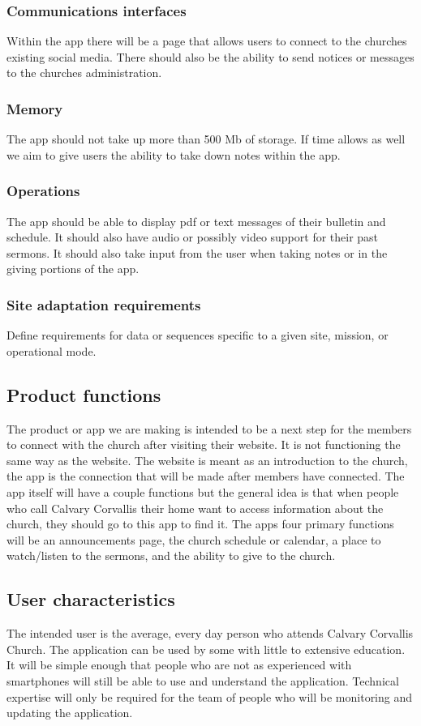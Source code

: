 \documentclass[letterpaper,10pt,draftclsnofoot,onecolumn,compsoc,titlepage]{IEEEtran}
\begin{document}
	\subsubsection{Communications interfaces}
	Within the app there will be a page that allows users to connect to the churches existing social media.
	There should also be the ability to send notices or messages to the churches administration.

	\subsubsection{Memory}
	The app should not take up more than 500 Mb of storage.
	If time allows as well we aim to give users the ability to take down notes within the app.

	\subsubsection{Operations}
	The app should be able to display pdf or text messages of their bulletin and schedule.
	It should also have audio or possibly video support for their past sermons.
	It should also take input from the user when taking notes or in the giving portions of the app.

	\subsubsection{Site adaptation requirements}
	Define requirements for data or sequences specific to a given site, mission, or operational mode.

	\subsection{Product functions}
	The product or app we are making is intended to be a next step for the members to connect with the church after visiting their website.
	It is not functioning the same way as the website.
	The website is meant as an introduction to the church, the app is the connection that will be made after members have connected.
	The app itself will have a couple functions but the general idea is that when people who call Calvary Corvallis their home want to access information about the church, they should go to this app to find it.
	The apps four primary functions will be an announcements page, the church schedule or calendar, a place to watch/listen to the sermons, and the ability to give to the church.

	\subsection{User characteristics}
	The intended user is the average, every day person who attends Calvary Corvallis Church.
	The application can be used by some with little to extensive education.
	It will be simple enough that people who are not as experienced with smartphones will still be able to use and understand the application.
	Technical expertise will only be required for the team of people who will be monitoring and updating the application.
	
\end{document}
